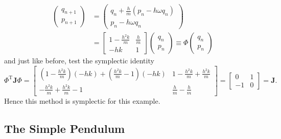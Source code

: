 \documentclass{report}
\theoremstyle{exampstyle} \newtheorem{example}[theorem]{Example}
\theoremstyle{exampstyle} \newtheorem{remark}[theorem]{Remark}
\theoremstyle{exampstyle} \newtheorem{definition}[theorem]{Definition}
\theoremstyle{exampstyle} \newtheorem{lemma}[theorem]{Lemma}
\begin{document}
\begin{equation*}
	\begin{aligned}
		\begin{pmatrix}
			q_{n+1} \\
			p_{n+1} 
		\end{pmatrix} &= \begin{pmatrix}
			q_{n} + \frac{h}{m} \left( p_{n} - h \omega q_n \right) \\
			p_{n} - h \omega q_n
		\end{pmatrix} \\
		&= \begin{bmatrix}
			1 - \frac{h^2 k}{m} & \frac{h}{m} \\
			-hk & 1
		\end{bmatrix} \begin{pmatrix}
			q_n \\
			p_n
		\end{pmatrix} \equiv \Phi \begin{pmatrix}
			q_n \\
			p_n
		\end{pmatrix}
	\end{aligned}
\end{equation*}
and just like before, test the symplectic identity
\begin{equation*}
	\Phi^\mathrm{T}\mathbf{J}\Phi = \begin{bmatrix}
		\left(1-\frac{h^2 k}{m}\right)(-hk) + \left(\frac{h^2 k}{m}-1\right)(-hk) & 1 - \frac{h^2 k}{m} + \frac{h^2 k}{m} \\
		-\frac{h^2 k}{m} + \frac{h^2 k}{m} -1 & \frac{h}{m} - \frac{h}{m}
	\end{bmatrix} = \begin{bmatrix}
		0 & 1 \\
		-1 & 0
	\end{bmatrix} = \mathbf{J}.
\end{equation*}
Hence this method is symplectic for this example.

\subsection{The Simple Pendulum}

\end{document}
